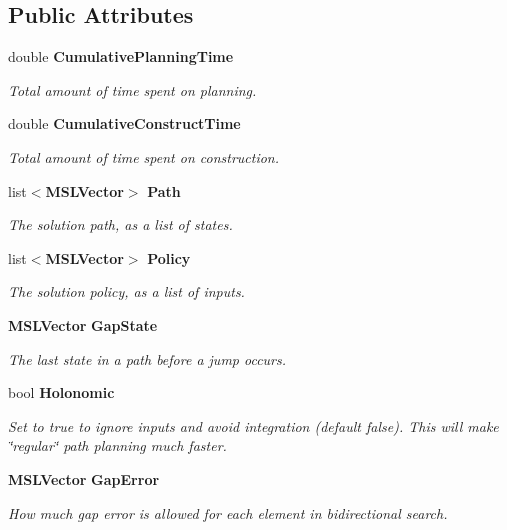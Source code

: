 \subsection*{Public Attributes}
\begin{CompactItemize}
\item 
double {\bf Cumulative\-Planning\-Time}
\begin{CompactList}\small\item\em Total amount of time spent on planning.\item\end{CompactList}\item 
double {\bf Cumulative\-Construct\-Time}
\begin{CompactList}\small\item\em Total amount of time spent on construction.\item\end{CompactList}\item 
list$<${\bf MSLVector}$>$ {\bf Path}
\begin{CompactList}\small\item\em The solution path, as a list of states.\item\end{CompactList}\item 
list$<${\bf MSLVector}$>$ {\bf Policy}
\begin{CompactList}\small\item\em The solution policy, as a list of inputs.\item\end{CompactList}\item 
{\bf MSLVector} {\bf Gap\-State}
\begin{CompactList}\small\item\em The last state in a path before a jump occurs.\item\end{CompactList}\item 
bool {\bf Holonomic}
\begin{CompactList}\small\item\em Set to true to ignore inputs and avoid integration (default false). This will make \char`\"{}regular\char`\"{} path planning much faster.\item\end{CompactList}\item 
{\bf MSLVector} {\bf Gap\-Error}
\begin{CompactList}\small\item\em How much gap error is allowed for each element in bidirectional search.\item\end{CompactList}\item 

\end{CompactItemize}
